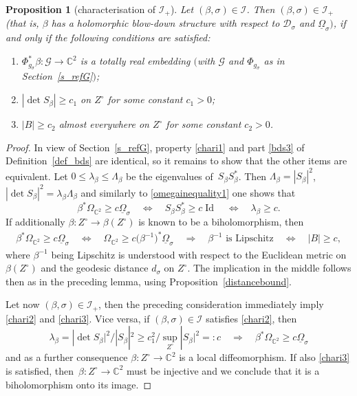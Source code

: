 \documentclass[pdftex]{sigma}
\numberwithin{equation}{section}
\newtheorem{Proposition}[Theorem]{Proposition}
\theoremstyle{definition}
\newcommand{\C}{\mathbb{C}} %
\newcommand{\1}{{\bf 1}}
\newcommand{\Om}{{\underline{\Omega}}}
\newcommand{\D}{\mathscr{D}}
\begin{document}
\begin{Proposition}[characterisation of $\mathcal I_+$]\label{chari}
	Let $(\beta,\sigma)\in \mathcal I$. Then $(\beta,\sigma)\in \mathcal I_+$ {\rm(}that is, $\beta$ has a holomorphic blow-down structure with respect to $\D_\sigma$ and $\Om_\sigma)$, if and only if the following conditions are satisfied:
	\begin{enumerate}[label=\rm(\roman*)]\itemsep=0pt
		\item\label{chari1} $\Phi_{g_\sigma}^*\beta \colon\mathcal G \rightarrow \C^2$ is a totally real embedding $($with $\mathcal G$ and $\Phi_{g_\sigma}$ as in Section~{\rm\ref{s_refG}}$)$;
		
		\item \label{chari2} $|{\det S_\beta}|\ge c_1$ on $Z^\circ$ for some constant $c_1>0$;
		
		\item \label{chari3} $|B|\ge c_2$ almost everywhere on $Z^\circ$ for some constant $c_2>0$.
	\end{enumerate}
\end{Proposition}

\begin{proof} In view of Section~\ref{s_refG}, property \ref{chari1} and part \ref{bds3} of Definition~\ref{def_bds} are identical, so it remains to show that the other items are equivalent.
Let $0\le \lambda_\beta\le \Lambda_\beta$ be the eigenvalues of~$S_\beta S_\beta^*$. Then $\Lambda_\beta = |S_\beta|^2$, $|{\det S_\beta}|^2 = \lambda_\beta \Lambda_\beta$ and similarly to \eqref{omegainequality1} one shows that
 \[%
\beta^*\Omega_{\C^2} \ge c \Om_\sigma\quad \Leftrightarrow \quad S_\beta S_\beta^* \ge c \operatorname{Id} \quad \Leftrightarrow \quad \lambda_\beta \ge c.
\]
If additionally $\beta\colon Z^\circ\rightarrow \beta(Z^\circ)$ is known to be a biholomorphism, then
 \begin{gather*}
\beta^*\Omega_{\C^2} \ge c \Om_\sigma\quad \Leftrightarrow \quad \Omega_{\C^2} \ge c\bigl(\beta^{-1}\bigr)^*\Om_\sigma \quad\Rightarrow \quad \beta^{-1} \text{ is Lipschitz} \quad \Leftrightarrow \quad |B|\ge c,
\end{gather*}
where $\beta^{-1}$ being Lipschitz is understood with respect to the Euclidean metric on $\beta(Z^\circ)$ and the geodesic distance $d_\sigma$ on $Z^\circ$. The implication in the middle follows then as in the preceding lemma, using Proposition~\ref{distancebound}.

Let now $(\beta,\sigma)\in \mathcal I_+$, then the preceding consideration immediately imply \ref{chari2} and \ref{chari3}. Vice versa, if $(\beta,\sigma)\in \mathcal I$ satisfies \ref{chari2}, then \[
\lambda_\beta = |{\det S_\beta|^2/}|S_\beta|^2
 \ge c_1^2/\sup_{Z^\circ}|S_\beta|^2=:c \quad \Rightarrow \quad \beta^*\Omega_{\C^2} \ge c \Om_\sigma
\]
and as a further consequence $\beta\colon Z^\circ\rightarrow \C^2$ is a local diffeomorphism.
If also \ref{chari3} is satisfied, then~${\beta\colon Z^\circ \rightarrow \C^2}$ must be injective and we conclude that it is a biholomorphism onto its image.
\end{proof}
\end{document}
